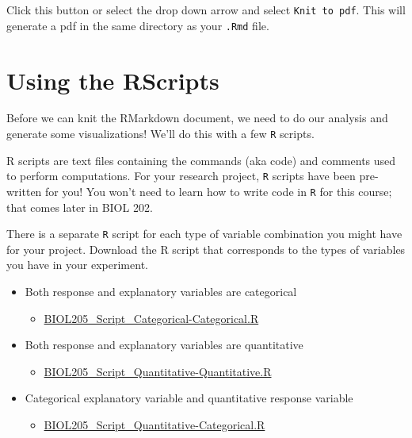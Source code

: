 \documentclass[
]{book}
\providecommand{\tightlist}{%
  \setlength{\itemsep}{0pt}\setlength{\parskip}{0pt}}
\begin{document}
Click this button or select the drop down arrow and select \texttt{Knit\ to\ pdf}. This will generate a pdf in the same directory as your \texttt{.Rmd} file.

\hypertarget{using-the-rscripts}{%
\section*{Using the RScripts}\label{using-the-rscripts}}

Before we can knit the RMarkdown document, we need to do our analysis and generate some visualizations! We'll do this with a few \texttt{R} scripts.

R scripts are text files containing the commands (aka code) and comments used to perform computations. For your research project, \texttt{R} scripts have been pre-written for you! You won't need to learn how to write code in \texttt{R} for this course; that comes later in BIOL 202.

There is a separate \texttt{R} script for each type of variable combination you might have for your project. Download the R script that corresponds to the types of variables you have in your experiment.

\begin{itemize}
\tightlist
\item
  Both response and explanatory variables are categorical

  \begin{itemize}
  \tightlist
  \item
    \href{https://osf.io/download/sg7y6}{BIOL205\_Script\_Categorical-Categorical.R}
  \end{itemize}
\item
  Both response and explanatory variables are quantitative

  \begin{itemize}
  \tightlist
  \item
    \href{https://osf.io/download/adwg4}{BIOL205\_Script\_Quantitative-Quantitative.R}
  \end{itemize}
\item
  Categorical explanatory variable and quantitative response variable

  \begin{itemize}
  \tightlist
  \item
    \href{https://osf.io/download/2hsk5}{BIOL205\_Script\_Quantitative-Categorical.R}
  \end{itemize}
\end{itemize}
\end{document}
